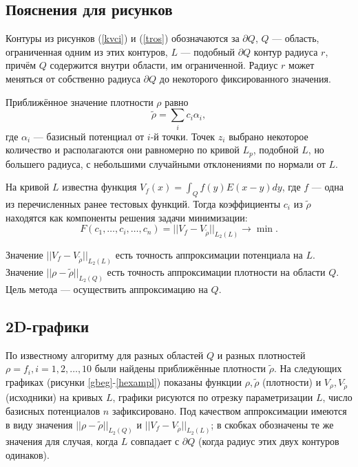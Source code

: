 \documentclass[a4paper, 12pt]{article}
\newcommand{\V}[1]{\int_Q #1(y) E(x-y) dy}
\begin{document}
\subsection{Пояснения для рисунков}
Контуры из рисунков (\ref{kvci}) и (\ref{tros}) обозначаются за $\partial Q$, $Q$ --- область, ограниченная одним из этих контуров,
$L$ --- подобный $\partial Q$ контур радиуса $r$, причём $Q$ содержится внутри области, им ограниченной. Радиус $r$ может меняться от собственно радиуса $\partial Q$ до некоторого фиксированного значения.

Приближённое значение плотности $\rho$ равно
\begin{equation*}
  \tilde{\rho} = \sum_i c_i \alpha_i,
\end{equation*}
где $\alpha_i$ --- базисный потенциал от $i$-й точки.
Точек $z_i$ выбрано некоторое количество и располагаются они равномерно по кривой $L_p$, подобной $L$, но большего радиуса, с небольшими случайными отклонениями по нормали от $L$.

На кривой $L$ известна функция $V_f(x)=\V{f}$, где $f$ --- одна из перечисленных ранее тестовых функций.
Тогда коэффициенты $c_i$ из $\tilde{\rho}$ находятся как компоненты решения задачи минимизации:
\begin{equation*}
  F(c_1,\dots,c_i,\dots,c_n)=||V_f-V_{\tilde{\rho} } ||_{L_2(L)}\rightarrow \min.
\end{equation*}

Значение $||V_f-V_{\tilde{\rho} } ||_{L_2(L)}$ есть точность аппроксимации потенциала на $L$.
Значение $||\rho-\tilde{\rho} ||_{L_2(Q)}$ есть точность аппроксимации плотности на области $Q$.
Цель метода --- осуществить аппроксимацию на $Q$.

\subsection{2D-графики}
По известному алгоритму для разных областей $Q$ и разных плотностей $\rho=f_i,i=1,2,\dots,10$ были найдены приближённые плотности $\tilde{\rho}$.
На следующих графиках (рисунки \ref{gbeg}-\ref{hexampl}) показаны функции $\rho, \tilde{\rho}$ (плотности) и $V_{\rho},V_{\tilde{\rho}}$ (исходники) на кривых $L$, графики рисуются по отрезку параметризации $L$, число базисных потенциалов $n$ зафиксировано.
Под качеством аппроксимации имеются в виду значения $||\rho-\tilde{\rho} ||_{L_2(Q)}$ и $||V_f-V_{\tilde{\rho} } ||_{L_2(L)}$; в скобках обозначены те же значения для случая, когда $L$ совпадает с $\partial Q$ (когда радиус этих двух контуров одинаков).
\end{document}
